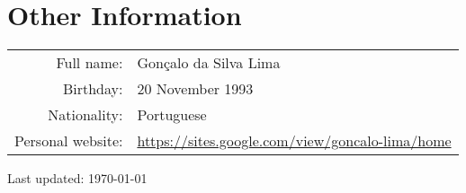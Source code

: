 \documentclass[a4paper,11pt]{article} %
\begin{document}
\section[Other Information]{\faInfoCircle \hspace{3pt} Other Information}

\begin{tabular}{rp{13	cm}}
	Full name: & Gonçalo da Silva Lima \\
	Birthday: & 20 November 1993 \\
	Nationality: & Portuguese	\\
	Personal website: & \href{https://sites.google.com/view/goncalo-lima/home}{https://sites.google.com/view/goncalo-lima/home} \\
\end{tabular}

\vspace{2cm}
\begin{flushright}
	Last updated: \today \\
\end{flushright}
\end{document}
